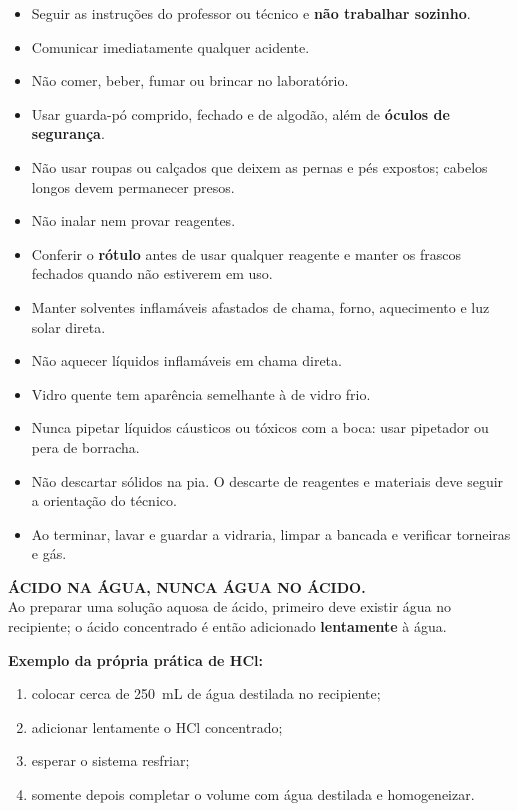 \documentclass[a4paper,12pt]{article}
\begin{document}
\begin{itemize}[leftmargin=1.6em]
    \item Seguir as instruções do professor ou técnico e \textbf{não trabalhar sozinho}.
    \item Comunicar imediatamente qualquer acidente.
    \item Não comer, beber, fumar ou brincar no laboratório.
    \item Usar guarda-pó comprido, fechado e de algodão, além de \textbf{óculos de segurança}.
    \item Não usar roupas ou calçados que deixem as pernas e pés expostos; cabelos longos devem permanecer presos.
    \item Não inalar nem provar reagentes.
    \item Conferir o \textbf{rótulo} antes de usar qualquer reagente e manter os frascos fechados quando não estiverem em uso.
    \item Manter solventes inflamáveis afastados de chama, forno, aquecimento e luz solar direta.
    \item Não aquecer líquidos inflamáveis em chama direta.
    \item Vidro quente tem aparência semelhante à de vidro frio.
    \item Nunca pipetar líquidos cáusticos ou tóxicos com a boca: usar pipetador ou pera de borracha.
    \item Não descartar sólidos na pia. O descarte de reagentes e materiais deve seguir a orientação do técnico.
    \item Ao terminar, lavar e guardar a vidraria, limpar a bancada e verificar torneiras e gás.
\end{itemize}

\begin{memorize}
\textbf{ÁCIDO NA ÁGUA, NUNCA ÁGUA NO ÁCIDO.}\\
Ao preparar uma solução aquosa de ácido, primeiro deve existir água no recipiente; o ácido concentrado é então adicionado \textbf{lentamente} à água.
\end{memorize}

\begin{procedimento}
\textbf{Exemplo da própria prática de HCl:}
\begin{enumerate}[leftmargin=1.7em]
    \item colocar cerca de \SI{250}{\milli\liter} de água destilada no recipiente;
    \item adicionar lentamente o HCl concentrado;
    \item esperar o sistema resfriar;
    \item somente depois completar o volume com água destilada e homogeneizar.
\end{enumerate}
\end{procedimento}
\end{document}
